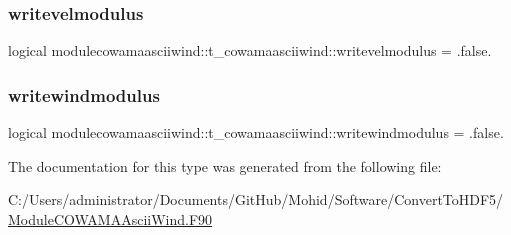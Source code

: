 \subsubsection{\texorpdfstring{writevelmodulus}{writevelmodulus}}
{\footnotesize\ttfamily logical modulecowamaasciiwind\+::t\+\_\+cowamaasciiwind\+::writevelmodulus = .false.\hspace{0.3cm}{\ttfamily [private]}}

\mbox{\label{structmodulecowamaasciiwind_1_1t__cowamaasciiwind_acf686b4f700cd9e82e30ce7d72ef8fac}} 
\subsubsection{\texorpdfstring{writewindmodulus}{writewindmodulus}}
{\footnotesize\ttfamily logical modulecowamaasciiwind\+::t\+\_\+cowamaasciiwind\+::writewindmodulus = .false.\hspace{0.3cm}{\ttfamily [private]}}



The documentation for this type was generated from the following file\+:\begin{DoxyCompactItemize}
\item 
C\+:/\+Users/administrator/\+Documents/\+Git\+Hub/\+Mohid/\+Software/\+Convert\+To\+H\+D\+F5/\mbox{\hyperlink{_module_c_o_w_a_m_a_ascii_wind_8_f90}{Module\+C\+O\+W\+A\+M\+A\+Ascii\+Wind.\+F90}}\end{DoxyCompactItemize}
